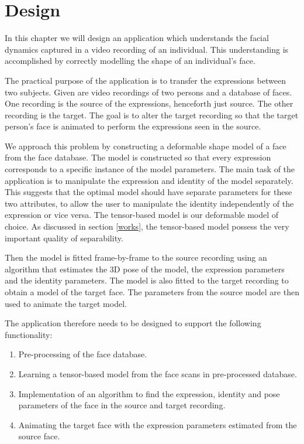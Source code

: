 \documentclass[11pt,a4paper]{report}
\begin{document}
\chapter{Design}\label{design}
In this chapter we will design an application which understands the facial
dynamics captured in a video recording of an individual. This understanding is
accomplished by correctly modelling the shape of an individual's face.

The practical purpose of the application is to transfer the expressions between two
subjects. Given are video recordings of two persons and a database of
faces. One recording is the source of the expressions, henceforth just source. The
other recording is the target. The goal is to alter the target recording so that
the target person's face is animated to perform the expressions seen in the
source.

We approach this problem by constructing a deformable shape model of a face from the
face database. The model is constructed so that every expression corresponds to a specific instance of the model
parameters. The main task of the application is to manipulate the expression and
identity of the model separately. This suggests that the optimal model should have
separate parameters for these two attributes, to allow the user to manipulate
the identity independently of the expression or vice versa.
The tensor-based model is our deformable model of choice. As discussed in
section \ref{works}, the tensor-based model possess the very
important quality of separability.

Then the model is fitted frame-by-frame to the source recording using an
algorithm that estimates the 3D pose of the model, the expression parameters and
the identity parameters. The model is also fitted to the target recording to obtain a model of the target face. The
parameters from the source model are then used to animate the target model.

The application therefore needs to be designed to support the following functionality:

\begin{enumerate}
\item Pre-processing of the face database.
\item Learning a tensor-based model from the face scans in pre-processed database.
\item Implementation of an algorithm to find the expression, identity and pose
  parameters of the face in the source and target recording.
\item Animating the target face with the expression parameters estimated from
  the source face.
\end{enumerate}
\end{document}
